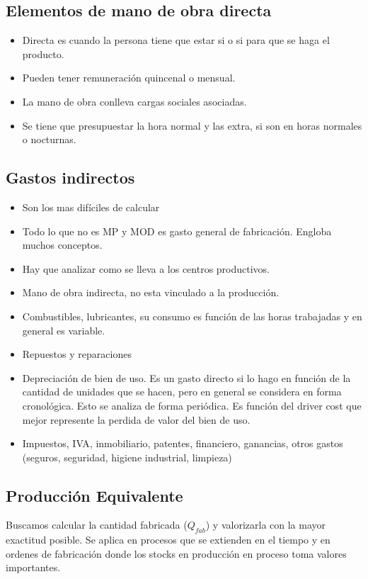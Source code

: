 \documentclass[titlepage,a4paper]{article}
\begin{document}
\subsection{Elementos de mano de obra directa}
\begin{itemize}
\item Directa es cuando la persona tiene que estar si o si para que se haga el producto.
\item Pueden tener remuneración quincenal o mensual. 
\item La mano de obra conlleva cargas sociales asociadas.
\item Se tiene que presupuestar la hora normal y las extra, si son en horas normales o nocturnas.
\end{itemize}



\subsection{Gastos indirectos}
\begin{itemize}
\item Son los mas difíciles de calcular
\item Todo lo que no es MP y MOD es gasto general de fabricación. Engloba muchos conceptos.
\item Hay que analizar como se lleva a los centros productivos.
\item Mano de obra indirecta, no esta vinculado a la producción.
\item Combustibles, lubricantes, su consumo es función de las horas trabajadas y en general es variable.
\item Repuestos y reparaciones
\item Depreciación de bien de uso. Es un gasto directo si lo hago en función de la cantidad de unidades que se hacen, pero en general se considera en forma cronológica. Esto se analiza de forma periódica. Es función del driver cost que mejor represente la perdida de valor del bien de uso.
\item Impuestos, IVA, inmobiliario, patentes, financiero, ganancias, otros gastos (seguros, seguridad, higiene industrial, limpieza)
\end{itemize}


\subsection{Producción Equivalente}
Buscamos calcular la cantidad fabricada ($Q_{fab}$) y valorizarla con la mayor exactitud posible. Se aplica en procesos que se extienden en el tiempo y en ordenes de fabricación donde los stocks en producción en proceso toma valores importantes. 
\end{document}
